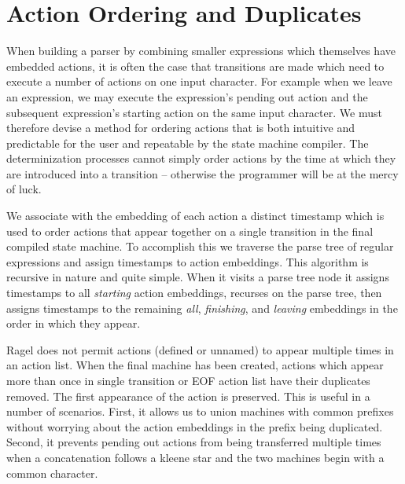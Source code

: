 \documentclass[letterpaper,11pt,oneside]{book}
\begin{document}
\begin{comment}
\begin{itemize}
\setlength{\parskip}{0in}
\item \verb|expr >^ (name, action) | -- Start state.
\item \verb|expr $^ (name, action) | -- All states.
\item \verb|expr %^ (name, action) | -- Final states.
\item \verb|expr <^ (name, action) | -- Not start state.
\item \verb|expr <>^ (name, action)| -- Not start and not final states.
\end{itemize}
\end{comment}

\section{Action Ordering and Duplicates}

When building a parser by combining smaller expressions which themselves have
embedded actions, it is often the case that transitions are made which need to
execute a number of actions on one input character. For example when we leave
an expression, we may execute the expression's pending out action and the
subsequent expression's starting action on the same input character.  We must
therefore devise a method for ordering actions that is both intuitive and
predictable for the user and repeatable by the state machine compiler. The
determinization processes cannot simply order actions by the time at which they
are introduced into a transition -- otherwise the programmer will be at the
mercy of luck.

We associate with the embedding of each action a distinct timestamp which is
used to order actions that appear together on a single transition in the final
compiled state machine. To accomplish this we traverse the parse tree of
regular expressions and assign timestamps to action embeddings. This algorithm
is recursive in nature and quite simple. When it visits a parse tree node it
assigns timestamps to all {\em starting} action embeddings, recurses on the
parse tree, then assigns timestamps to the remaining {\em all}, {\em
finishing}, and {\em leaving} embeddings in the order in which they appear.

Ragel does not permit actions (defined or unnamed) to appear multiple times in
an action list.  When the final machine has been created, actions which appear
more than once in single transition or EOF action list have their duplicates
removed. The first appearance of the action is preserved. This is useful in a
number of scenarios.  First, it allows us to union machines with common
prefixes without worrying about the action embeddings in the prefix being
duplicated.  Second, it prevents pending out actions from being transferred multiple times
when a concatenation follows a kleene star and the two machines begin with a common
character.
\end{document}
